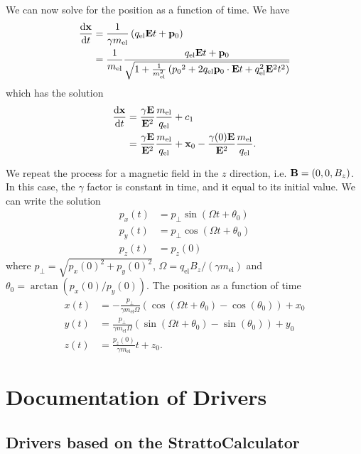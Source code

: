 \documentclass[10pt,letterpaper,extrafontsizes, onecolumn,openright]{memoir}
\begin{document}
We can now solve for the position as a function of time. We have
	\begin{align}
		\dv{\vb{x}}{t} &= \frac{1}{\gamma m_\text{el}}\left(q_\text{el}\vb{E}t+\vb{p}_0\right) \\
		               &= \frac{1}{m_\text{el}}\frac{q_\text{el}\vb{E}t+\vb{p}_0}{\sqrt{1+\frac{1}{m_\text{el}^2}\left({p_0}^2+2q_\text{el}\vb{p}_0\cdot\vb{E}t+q_\text{el}^2\vb{E}^2t^2\right)}}
	\end{align}
which has the solution
	\begin{align}
		\dv{\vb{x}}{t} &= \frac{\gamma\vb{E}}{\vb{E}^2}\frac{m_\text{el}}{q_\text{el}}+c_1 \\
		               &= \frac{\gamma\vb{E}}{\vb{E}^2}\frac{m_\text{el}}{q_\text{el}}
		                 +\vb{x}_0-\frac{\gamma(0)\vb{E}}{\vb{E}^2}\frac{m_\text{el}}{q_\text{el}}.
  \end{align}

We repeat the process for a magnetic field in the $z$ direction, i.e.
$\vb{B}=(0,0,B_z)$. In this case, the $\gamma$ factor is constant in time,
and it equal to its initial value. We can write the solution
	\begin{align}
		p_x(t) &= p_\perp \sin(\Omega t + \theta_0) \\
		p_y(t) &= p_\perp \cos(\Omega t + \theta_0) \\
		p_z(t) &= p_z(0)
	\end{align}
where $p_\perp=\sqrt{p_x(0)^2+p_y(0)^2}$, $\Omega=q_\text{el}B_z/(\gamma m_\text{el})$
and $\theta_0=\arctan(p_x(0)/p_y(0))$. The position as a function of time
	\begin{align}
		x(t)  &= -\frac{p_\perp}{\gamma m_\text{el}\Omega}\left(\cos(\Omega t+\theta_0)-\cos(\theta_0)\right)+x_0 \\
		y(t)  &=  \frac{p_\perp}{\gamma m_\text{el}\Omega}\left(\sin(\Omega t+\theta_0)-\sin(\theta_0)\right)+y_0 \\
		z(t)  &= \frac{p_z(0)}{\gamma m_\text{el}}t+z_0.
	\end{align}

\chapter{Documentation of Drivers}

\section{Drivers based on the StrattoCalculator}
\end{document}
